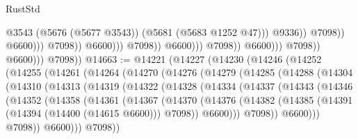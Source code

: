 \begin{lexlean}{RustStd}
\begin{coremodule}
                                                                @3543
                                                                (@5676 (@5677 @3543))
                                                                (@5681 (@5683 @1252 @47)))
                                                              @9336))
                                                          @7098))
                                                      @6600)))
                                                @7098))
                                            @6600)))
                                      @7098))
                                  @6600)))
                            @7098))
                        @6600)))
                  @7098))
              @6600)))
        @7098))
@14663 := @14221
    (@14227
      (@14230
        (@14246
          (@14252
            (@14255
              (@14261
                (@14264
                  (@14270
                    (@14276
                      (@14279
                        (@14285
                          (@14288
                            (@14304
                              (@14310
                                (@14313
                                  (@14319
                                    (@14322
                                      (@14328
                                        (@14334
                                          (@14337
                                            (@14343
                                              (@14346
                                                (@14352
                                                  (@14358
                                                    (@14361
                                                      (@14367
                                                        (@14370
                                                          (@14376
                                                            (@14382
                                                              (@14385
                                                                (@14391
                                                                  (@14394 (@14400 (@14615 @6600)))
                                                                  @7098))
                                                              @6600)))
                                                        @7098))
                                                    @6600)))
                                              @7098))
                                          @6600)))
                                    @7098))

\end{coremodule}
\end{lexlean}
